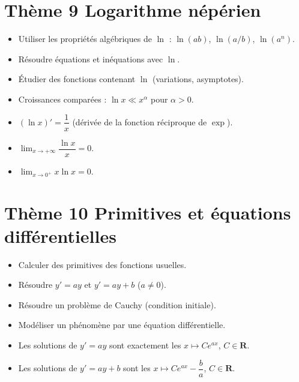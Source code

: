 \documentclass[11pt,a4paper,openany]{book}
\theoremstyle{definition}
\begin{document}
    \section*{Thème 9 \textemdash{} Logarithme népérien}
    \begin{capacitesbox}
    \begin{itemize}
        \item Utiliser les propriétés algébriques de $\ln$ :
              $\ln(ab)$, $\ln(a/b)$, $\ln(a^n)$.
        \item Résoudre équations et inéquations avec $\ln$.
        \item Étudier des fonctions contenant $\ln$ (variations, asymptotes).
        \item Croissances comparées : $\ln x \ll x^\alpha$ pour $\alpha>0$.
    \end{itemize}
    \end{capacitesbox}
    \begin{demoprogbox}
    \begin{itemize}
        \item $(\ln x)'=\dfrac{1}{x}$ (dérivée de la fonction réciproque de
              $\exp$).
        \item $\displaystyle\lim_{x\to+\infty}\dfrac{\ln x}{x}=0$.
        \item $\displaystyle\lim_{x\to 0^+}x\ln x=0$.
    \end{itemize}
    \end{demoprogbox}

    \section*{Thème 10 \textemdash{} Primitives et équations différentielles}
    \begin{capacitesbox}
    \begin{itemize}
        \item Calculer des primitives des fonctions usuelles.
        \item Résoudre $y'=ay$ et $y'=ay+b$ ($a\neq 0$).
        \item Résoudre un problème de Cauchy (condition initiale).
        \item Modéliser un phénomène par une équation différentielle.
    \end{itemize}
    \end{capacitesbox}
    \begin{demoprogbox}
    \begin{itemize}
        \item Les solutions de $y'=ay$ sont exactement les
              $x\mapsto Ce^{ax}$, $C\in\mathbf{R}$.
        \item Les solutions de $y'=ay+b$ sont les
              $x\mapsto Ce^{ax}-\dfrac{b}{a}$, $C\in\mathbf{R}$.
    \end{itemize}
    \end{demoprogbox}
\end{document}

